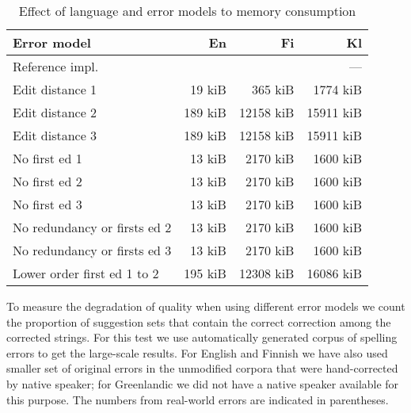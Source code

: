 \documentclass[11pt]{article}
\begin{document}
\begin{table}[h]
\begin{center}
\begin{scriptsize}
\begin{tabular}{|l|rrr|}
\hline
\bf Error model & \bf En & \bf Fi & \bf Kl \\ 
\hline
Reference impl.   & & & --- \\
\hline
Edit distance 1 &
19 kiB&365 kiB&1774 kiB
\\
Edit distance 2 &
189 kiB&12158 kiB&15911 kiB
\\
Edit distance 3 &
189 kiB&12158 kiB&15911 kiB
\\
No first ed 1 & 
13 kiB&2170 kiB&1600 kiB
\\
No first ed 2 &
13 kiB&2170 kiB&1600 kiB
\\
No first ed 3 &
13 kiB&2170 kiB&1600 kiB
\\
No redundancy or firsts ed 2 &
13 kiB&2170 kiB&1600 kiB
\\
No redundancy or firsts ed 3 &
13 kiB&2170 kiB&1600 kiB
\\
Lower order first ed 1 to 2 &
195 kiB&12308 kiB&16086 kiB
\\
\hline
\end{tabular}
\end{scriptsize}
\end{center}
\caption{\label{table:error-model-vs-language-memory} Effect of language and 
error models to memory consumption}
\end{table}

To measure the degradation of quality when using different error models we
count the proportion of suggestion sets that contain the correct correction
among the corrected strings. For this test we use automatically generated corpus
of spelling errors to get the large-scale results. For English and Finnish we
have also used smaller set of original errors in the unmodified corpora that
were hand-corrected by native speaker; for Greenlandic we did not have a native
speaker available for this purpose. The numbers from real-world errors are 
indicated in parentheses.
\end{document}
